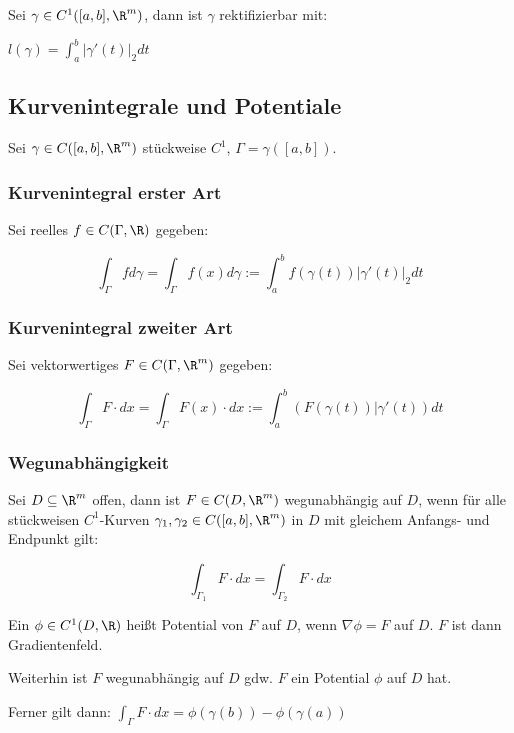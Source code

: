 Sei $\gamma \in C^1([a, b], \R^m)$, dann ist $\gamma$ rektifizierbar mit:

$l(\gamma) = \int_a^b |\gamma'(t)|_2 dt$

\subsection*{Kurvenintegrale und Potentiale}

Sei $\gamma \in C([a, b], \R^m)$ stückweise $C^1$, $\Gamma = \gamma([a, b])$.

\subsubsection*{Kurvenintegral erster Art}

Sei reelles $f \in C(\Gamma, \R)$ gegeben:

\vspace*{-5mm}
\[ \int_\Gamma f d\gamma = \int_\Gamma f(x) d\gamma := \int_a^b f(\gamma(t)) | \gamma'(t) |_2 dt \]

\subsubsection*{Kurvenintegral zweiter Art}

Sei vektorwertiges $F \in C(\Gamma, \R^m)$ gegeben:

\vspace*{-5mm}
\[ \int_\Gamma F \cdot dx = \int_\Gamma F(x) \cdot dx := \int_a^b (F(\gamma(t))|\gamma'(t)) dt \]

\subsubsection*{Wegunabhängigkeit}

Sei $D \subseteq \R^m$ offen, dann ist $F \in C(D, \R^m)$ wegunabhängig auf $D$, wenn für alle stückweisen $C^1$-Kurven $\gamma_1, \gamma_2 \in C([a, b], \R^m)$ in $D$ mit gleichem Anfangs- und Endpunkt gilt:

\[ \int_{\Gamma_1} F \cdot dx = \int_{\Gamma_2} F \cdot dx \]

Ein $\phi \in C^1(D, \R)$ heißt Potential von $F$ auf $D$, wenn $\nabla\phi = F$ auf $D$. $F$ ist dann Gradientenfeld.

Weiterhin ist $F$ wegunabhängig auf $D$ gdw. $F$ ein Potential $\phi$ auf $D$ hat.

Ferner gilt dann: $\int_\Gamma F \cdot dx = \phi(\gamma(b))-\phi(\gamma(a))$

